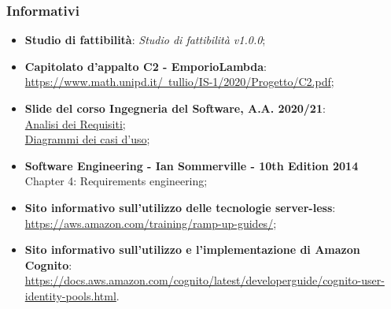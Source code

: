     \subsubsection{Informativi}
    \begin{itemize}
        \item \textbf{Studio di fattibilità}: \textit{Studio di fattibilità v1.0.0};
        \item \textbf{Capitolato d'appalto C2 - EmporioLambda}:\\ \href{https://www.math.unipd.it/~tullio/IS-1/2020/Progetto/C2.pdf}{https://www.math.unipd.it/~tullio/IS-1/2020/Progetto/C2.pdf};
        \item \textbf{Slide del corso Ingegneria del Software, A.A. 2020/21}: \\ \href{https://www.math.unipd.it/~tullio/IS-1/2020/Dispense/L07.pdf}{Analisi dei Requisiti}; \\ \href{https://www.math.unipd.it/~rcardin/swea/2021/Diagrammi%20Use%20Case_4x4.pdf}{Diagrammi dei casi d'uso};
        \item \textbf{Software Engineering - Ian Sommerville - 10th Edition 2014}\\
        Chapter 4: Requirements engineering;
        \item \textbf{Sito informativo sull'utilizzo delle tecnologie server-less}:\\ \href{https://aws.amazon.com/training/ramp-up-guides/}{https://aws.amazon.com/training/ramp-up-guides/};
        \item \textbf{Sito informativo sull'utilizzo e l'implementazione di Amazon Cognito}:\\ \href{https://docs.aws.amazon.com/cognito/latest/developerguide/cognito-user-identity-pools.html}{https://docs.aws.amazon.com/cognito/latest/developerguide/cognito-user-identity-pools.html}.
    \end{itemize}
